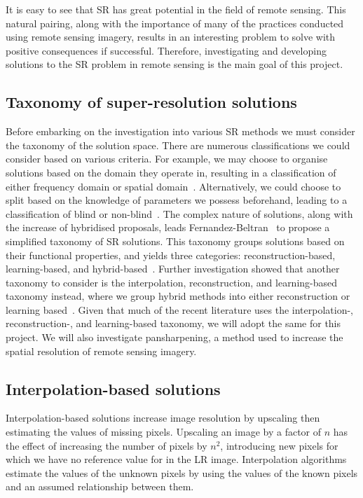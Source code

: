 It is easy to see that SR has great potential in the field of remote sensing. This natural pairing, along with the importance of many of the practices conducted using remote sensing imagery, results in an interesting problem to solve with positive consequences if successful. Therefore, investigating and developing solutions to the SR problem in remote sensing is the main goal of this project.

\subsection{Taxonomy of super-resolution solutions}
Before embarking on the investigation into various SR methods we must consider the taxonomy of the solution space. There are numerous classifications we could consider based on various criteria. For example, we may choose to organise solutions based on the domain they operate in, resulting in a classification of either frequency domain or spatial domain~\cite{superResRemoteSensingOverview}. Alternatively, we could choose to split based on the knowledge of parameters we possess beforehand, leading to a classification of blind or non-blind~\cite{superResRemoteSensingOverview}. The complex nature of solutions, along with the increase of hybridised proposals, leads Fernandez-Beltran \etal\ to propose a simplified taxonomy of SR solutions. This taxonomy groups solutions based on their functional properties, and yields three categories: reconstruction-based, learning-based, and hybrid-based~\cite{superResRemoteSensingOverview}. Further investigation showed that another taxonomy to consider is the interpolation, reconstruction, and learning-based taxonomy instead, where we group hybrid methods into either reconstruction or learning based~\cite{remoteSensingDeepLearningReview, remoteSensingGANsReview, isrgan, tesagan}. Given that much of the recent literature uses the interpolation-, reconstruction-, and learning-based taxonomy, we will adopt the same for this project. We will also investigate pansharpening, a method used to increase the spatial resolution of remote sensing imagery.

\subsection{Interpolation-based solutions}
Interpolation-based solutions increase image resolution by upscaling then estimating the values of missing pixels. Upscaling an image by a factor of $n$ has the effect of increasing the number of pixels by $n^2$, introducing new pixels for which we have no reference value for in the LR image. Interpolation algorithms estimate the values of the unknown pixels by using the values of the known pixels and an assumed relationship between them. 

